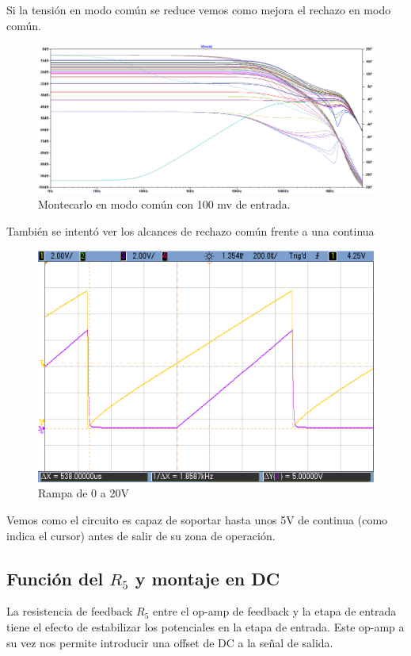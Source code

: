 Si la tensión en modo común se reduce vemos como mejora el rechazo en modo común.
\begin{figure}[H]
	\centering
	\includegraphics[height=0.3\textheight]{./ImagenesDeSimulaciones/MonteCarloModoComunGrande100mv.png}
	\caption{Montecarlo en modo común con 100 mv de entrada.}
\end{figure} 

También se intentó ver los alcances de rechazo común frente a una continua
\begin{figure}[H]
	\centering
	\includegraphics[height=0.3\textheight]{./ImagenesDeOsciloscopio/ModoComunContinua.png}
	\caption{Rampa de 0 a 20V}
\end{figure} 

Vemos como el circuito es capaz de soportar hasta unos 5V de continua (como indica el cursor) antes de salir de su zona de operación.

\subsection{Función del $R_5$ y montaje en DC}
La resistencia de feedback $R_5$ entre el op-amp de feedback y la etapa de entrada tiene el efecto de estabilizar los potenciales en la etapa de entrada. Este op-amp a su vez nos permite introducir una offset de DC a la señal de salida.

